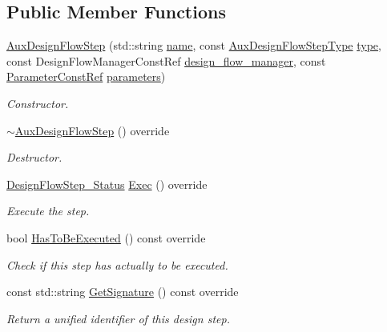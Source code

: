 \subsection*{Public Member Functions}
\begin{DoxyCompactItemize}
\item 
\hyperlink{classAuxDesignFlowStep_a9a2a680f317e811409dc108a209f98c9}{Aux\+Design\+Flow\+Step} (std\+::string \hyperlink{classAuxDesignFlowStep_af8d85f43fd8f5fad0e80d45dcb43105c}{name}, const \hyperlink{design__flow__aux__step_8hpp_a11050839fc7a6c59f7ec7eb2d1f1568b}{Aux\+Design\+Flow\+Step\+Type} \hyperlink{classAuxDesignFlowStep_abd729d912bc25066e2508f244b6eed8d}{type}, const Design\+Flow\+Manager\+Const\+Ref \hyperlink{classDesignFlowStep_ab770677ddf087613add30024e16a5554}{design\+\_\+flow\+\_\+manager}, const \hyperlink{Parameter_8hpp_a37841774a6fcb479b597fdf8955eb4ea}{Parameter\+Const\+Ref} \hyperlink{classDesignFlowStep_a802eaafe8013df706370679d1a436949}{parameters})
\begin{DoxyCompactList}\small\item\em Constructor. \end{DoxyCompactList}\item 
\hyperlink{classAuxDesignFlowStep_aef7b02869e6c9c4dac631332ab0b8b92}{$\sim$\+Aux\+Design\+Flow\+Step} () override
\begin{DoxyCompactList}\small\item\em Destructor. \end{DoxyCompactList}\item 
\hyperlink{design__flow__step_8hpp_afb1f0d73069c26076b8d31dbc8ebecdf}{Design\+Flow\+Step\+\_\+\+Status} \hyperlink{classAuxDesignFlowStep_a74c09957fafe9160d82120a4fa2f3e7f}{Exec} () override
\begin{DoxyCompactList}\small\item\em Execute the step. \end{DoxyCompactList}\item 
bool \hyperlink{classAuxDesignFlowStep_a7ff8544122f2f0ec2588cdbc5a9fca4a}{Has\+To\+Be\+Executed} () const override
\begin{DoxyCompactList}\small\item\em Check if this step has actually to be executed. \end{DoxyCompactList}\item 
const std\+::string \hyperlink{classAuxDesignFlowStep_a0ed46b87b6526026f9b405f35ba06244}{Get\+Signature} () const override
\begin{DoxyCompactList}\small\item\em Return a unified identifier of this design step. \end{DoxyCompactList}\item 

\end{DoxyCompactItemize}

